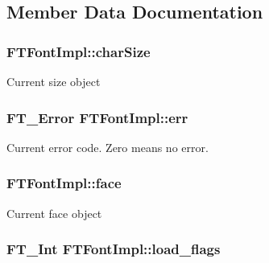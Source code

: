 \subsection{Member Data Documentation}
\hypertarget{class_f_t_font_impl_a9ec32ea40b0d1ea53442daec1bbaade1}{
\subsubsection[{char\-Size}]{ F\-T\-Font\-Impl\-::char\-Size\hspace{0.3cm}{\ttfamily [protected]}}}\label{class_f_t_font_impl_a9ec32ea40b0d1ea53442daec1bbaade1}
Current size object \hypertarget{class_f_t_font_impl_a39510c5a3665ae65bc7ff9b96c25b0c9}{
\subsubsection[{err}]{\setlength{\rightskip}{0pt plus 5cm}F\-T\-\_\-\-Error F\-T\-Font\-Impl\-::err\hspace{0.3cm}{\ttfamily [protected]}}}\label{class_f_t_font_impl_a39510c5a3665ae65bc7ff9b96c25b0c9}
Current error code. Zero means no error. \hypertarget{class_f_t_font_impl_ab35b9e1966574c6bb88bff520e9c33df}{
\subsubsection[{face}]{ F\-T\-Font\-Impl\-::face\hspace{0.3cm}{\ttfamily [protected]}}}\label{class_f_t_font_impl_ab35b9e1966574c6bb88bff520e9c33df}
Current face object \hypertarget{class_f_t_font_impl_a217737b273e6abaa0dd6d837d5677e56}{
\subsubsection[{load\-\_\-flags}]{\setlength{\rightskip}{0pt plus 5cm}F\-T\-\_\-\-Int F\-T\-Font\-Impl\-::load\-\_\-flags\hspace{0.3cm}{\ttfamily [protected]}}}\label{class_f_t_font_impl_a217737b273e6abaa0dd6d837d5677e56}
